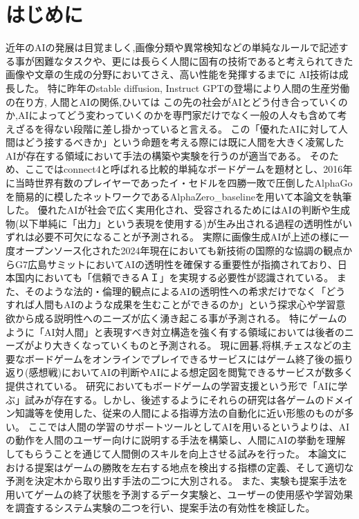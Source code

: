 \chapter{はじめに}
近年のAIの発展は目覚ましく,画像分類や異常検知などの単純なルールで記述する事が困難なタスクや、更には長らく人間に固有の技術であると考えられてきた画像や文章の生成の分野においてさえ、高い性能を発揮するまでに
AI技術は成長した。
特に昨年のstable diffusion\cite{diffusion}, Instruct GPT\cite{GPT}の登場により人間の生産労働の在り方, 人間とAIの関係,ひいては
この先の社会がAIとどう付き合っていくのか,AIによってどう変わっていくのかを専門家だけでなく一般の人々も含めて考えざるを得ない段階に差し掛かっていると言える。
この「優れたAIに対して人間はどう接するべきか」という命題を考える際には既に人間を大きく凌駕したAIが存在する領域において手法の構築や実験を行うのが適当である。
そのため、ここではconnect4と呼ばれる比較的単純なボードゲームを題材とし、2016年に当時世界有数のプレイヤーであったイ・セドルを四勝一敗で圧倒したAlphaGo\cite{AlphaGo}\cite{Nikkei}を簡易的に模したネットワークであるAlphaZero\_baseline\cite{baseline}を用いて本論文を執筆した。
優れたAIが社会で広く実用化され、受容されるためにはAIの判断や生成物(以下単純に「出力」という表現を使用する)が生み出される過程の透明性がいずれは必要不可欠になることが予測される。
実際に画像生成AIが上述の様に一度オープンソース化された2024年現在においても新技術の国際的な協調の観点からG7広島サミットにおいてAIの透明性を確保する重要性が指摘されており\cite{Hiroshima}、日本国内においても「信頼できるＡＩ」を実現する必要性が認識されている\cite{グランドデザイン}。
また、そのような法的・倫理的観点によるAIの透明性への希求だけでなく「どうすれば人間もAIのような成果を生むことができるのか」という探求心や学習意欲から成る説明性へのニーズが広く湧き起こる事が予測される。
特にゲームのように「AI対人間」と表現すべき対立構造を強く有する領域においては後者のニーズがより大きくなっていくものと予測される。
現に囲碁,将棋,チェスなどの主要なボードゲームをオンラインでプレイできるサービスにはゲーム終了後の振り返り(感想戦)においてAIの判断やAIによる想定図を閲覧できるサービスが数多く提供されている。
研究においてもボードゲームの学習支援という形で「AIに学ぶ」試みが存在する。しかし、後述するようにそれらの研究は各ゲームのドメイン知識等を使用した、従来の人間による指導方法の自動化に近い形態のものが多い。
ここでは人間の学習のサポートツールとしてAIを用いるというよりは、AIの動作を人間のユーザー向けに説明する手法を構築し、人間にAIの挙動を理解してもらうことを通じて人間側のスキルを向上させる試みを行った。
本論文における提案はゲームの勝敗を左右する地点を検出する指標の定義、そして適切な予測を決定木から取り出す手法の二つに大別される。
また、実験も提案手法を用いてゲームの終了状態を予測するデータ実験と、ユーザーの使用感や学習効果を調査するシステム実験の二つを行い、提案手法の有効性を検証した。